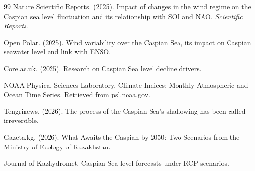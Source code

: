 \documentclass[12pt,a4paper,twocolumn]{article}
\begin{document}
\begin{thebibliography}{99}
Nature Scientific Reports. (2025). Impact of changes in the wind regime on the Caspian sea level fluctuation and its relationship with SOI and NAO. \textit{Scientific Reports}.

Open Polar. (2025). Wind variability over the Caspian Sea, its impact on Caspian seawater level and link with ENSO.

Core.ac.uk. (2025). Research on Caspian Sea level decline drivers.

NOAA Physical Sciences Laboratory. Climate Indices: Monthly Atmospheric and Ocean Time Series. Retrieved from psl.noaa.gov.

Tengrinews. (2026). The process of the Caspian Sea's shallowing has been called irreversible.

Gazeta.kg. (2026). What Awaits the Caspian by 2050: Two Scenarios from the Ministry of Ecology of Kazakhstan.

Journal of Kazhydromet. Caspian Sea level forecasts under RCP scenarios.

\end{thebibliography}
\end{document}
